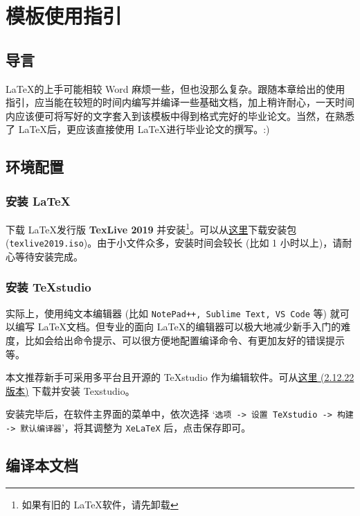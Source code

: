 
\chapter{模板使用指引}

\section{导言}

\LaTeX 的上手可能相较 Word 麻烦一些，但也没那么复杂。跟随本章给出的使用指引，应当能在较短的时间内编写并编译一些基础文档，加上稍许耐心，一天时间内应该便可将写好的文字套入到该模板中得到格式完好的毕业论文。当然，在熟悉了 \LaTeX 后，更应该直接使用 \LaTeX 进行毕业论文的撰写。:)

\section{环境配置}

\subsection{安装 \LaTeX}

下载 \LaTeX 发行版 \textbf{TexLive 2019} 并安装\footnote{如果有旧的 \LaTeX 软件，请先卸载}。可以从\href{http://mirror.ctan.org/systems/texlive/Images/}{这里}下载安装包 (\texttt{texlive2019.iso})。由于小文件众多，安装时间会较长 (比如 1 小时以上)，请耐心等待安装完成。

\subsection{安装 TeXstudio}

实际上，使用纯文本编辑器 (比如 \texttt{NotePad++, Sublime Text, VS Code} 等) 就可以编写 \LaTeX 文档。但专业的面向 \LaTeX 的编辑器可以极大地减少新手入门的难度，比如会给出命令提示、可以很方便地配置编译命令、有更加友好的错误提示等。

本文推荐新手可采用多平台且开源的 TeXstudio 作为编辑软件。可从\href{https://github.com/texstudio-org/texstudio/releases/download/2.12.22/texstudio-2.12.22-win-qt5.exe}{这里 (2.12.22 版本)} 下载并安装 Texstudio。

安装完毕后，在软件主界面的菜单中，依次选择 `\texttt{选项 -> 设置 TeXstudio -> 构建 -> 默认编译器}'，将其调整为 \texttt{XeLaTeX} 后，点击保存即可。

\section{编译本文档}


